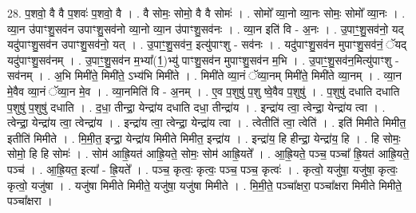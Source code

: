 \documentclass[17pt]{extarticle}
\begin{document}
28. प॒शवो॒ वै वै प॒शवः॑ प॒शवो॒ वै । . वै सोमः॒ सोमो॒ वै वै सोमः॑ । . सोमो᳚ व्या॒नो व्या॒नः सोमः॒ सोमो᳚ व्या॒नः । . व्या॒न उ॑पाꣳशु॒सव॑न उपाꣳशु॒सव॑नो व्या॒नो व्या॒न उ॑पाꣳशु॒सव॑नः । . व्या॒न इति॑ वि - अ॒नः । . उ॒पाꣳ॒॒शु॒सव॑नो॒ यद् यदु॑पाꣳशु॒सव॑न उपाꣳशु॒सव॑नो॒ यत् । . उ॒पाꣳ॒॒शु॒सव॑न॒ इत्यु॑पाꣳशु - सव॑नः । . यदु॑पाꣳशु॒सव॑न मुपाꣳशु॒सव॑नं॒ ॅयद् यदु॑पाꣳशु॒सव॑नम् । . उ॒पाꣳ॒॒शु॒सव॑न म॒भ्या᳚(1॒)भ्यु॑ पाꣳशु॒सव॑न मुपाꣳशु॒सव॑न म॒भि । . उ॒पाꣳ॒॒शु॒सव॑न॒मित्यु॑पाꣳशु - सव॑नम् । . अ॒भि मिमी॑ते॒ मिमी॑ते॒ ऽभ्य॑भि मिमी॑ते । . मिमी॑ते व्या॒नं ॅव्या॒नम् मिमी॑ते॒ मिमी॑ते व्या॒नम् । . व्या॒न मे॒वैव व्या॒नं ॅव्या॒न मे॒व । . व्या॒नमिति॑ वि - अ॒नम् । . ए॒व प॒शुषु॑ प॒शु ष्वे॒वैव प॒शुषु॑ । . प॒शुषु॑ दधाति दधाति प॒शुषु॑ प॒शुषु॑ दधाति । . द॒धा॒ तीन्द्रा॒ येन्द्रा॑य दधाति दधा॒ तीन्द्रा॑य । . इन्द्रा॑य त्वा॒ त्वेन्द्रा॒ येन्द्रा॑य त्वा । . त्वेन्द्रा॒ येन्द्रा॑य त्वा॒ त्वेन्द्रा॑य । . इन्द्रा॑य त्वा॒ त्वेन्द्रा॒ येन्द्रा॑य त्वा । . त्वेतीति॑ त्वा॒ त्वेति॑ । . इति॑ मिमीते मिमीत॒ इतीति॑ मिमीते । . मि॒मी॒त॒ इन्द्रा॒ येन्द्रा॑य मिमीते मिमीत॒ इन्द्रा॑य । . इन्द्रा॑य॒ हि हीन्द्रा॒ येन्द्रा॑य॒ हि । . हि सोमः॒ सोमो॒ हि हि सोमः॑ । . सोम॑ आह्रि॒यत॑ आह्रि॒यते॒ सोमः॒ सोम॑ आह्रि॒यते᳚ । . आ॒ह्रि॒यते॒ पञ्च॒ पञ्चा᳚ ह्रि॒यत॑ आह्रि॒यते॒ पञ्च॑ । . आ॒ह्रि॒यत॒ इत्या᳚ - ह्रि॒यते᳚ । . पञ्च॒ कृत्वः॒ कृत्वः॒ पञ्च॒ पञ्च॒ कृत्वः॑ । . कृत्वो॒ यजु॑षा॒ यजु॑षा॒ कृत्वः॒ कृत्वो॒ यजु॑षा । . यजु॑षा मिमीते मिमीते॒ यजु॑षा॒ यजु॑षा मिमीते । . मि॒मी॒ते॒ पञ्चा᳚क्षरा॒ पञ्चा᳚क्षरा मिमीते मिमीते॒ पञ्चा᳚क्षरा । \newline
\end{document}
